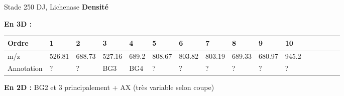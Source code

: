 \documentclass[10pt]{beamer}
\begin{document}
\begin{frame}{Stade 250 DJ, Lichenase}
    \textbf{Densité}
  
    \textbf{En 3D :}
    \vspace{-0.4cm}
    \begin{table}[]
    \centering
    \begin{adjustbox}{max width=1\textwidth}
      \begin{tabular}{llllllllllllllll}
        \toprule
        Ordre & 1       & 2       & 3       & 4       & 5       & 6       & 7       & 8       & 9       & 10       \\
        \midrule
        m/z &   526.81 & 688.73 & 527.16 & 689.2 & 808.67 & 803.82 & 803.19 & 689.33 & 680.97 & 945.2 \\
        Annotation &  ? & ? & BG3 & BG4 & ? & ? & ? & ? & ? & ?\\
        \bottomrule
      \end{tabular}
    \end{adjustbox}
  \end{table}



  \textbf{En 2D :} BG2 et 3 principalement + AX (très variable selon coupe)


\end{frame}
\end{document}
